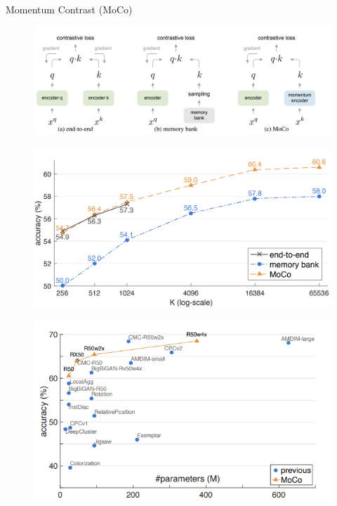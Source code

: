 \begin{frame}[allowframebreaks]{Momentum Contrast (MoCo)}
    \framebreak

    \begin{figure}
        \centering
        \includegraphics[width=1\linewidth,height=0.95\textheight,keepaspectratio]{images/ssl/slide_69_1_img.png}
    \end{figure}

    \framebreak

    \begin{figure}
        \centering
        \includegraphics[width=1\linewidth,height=0.95\textheight,keepaspectratio]{images/ssl/slide_70_1_img.png}
    \end{figure}

    \framebreak

    \begin{figure}
        \centering
        \includegraphics[width=1\linewidth,height=0.95\textheight,keepaspectratio]{images/ssl/slide_71_1_img.png}
    \end{figure}


\end{frame}
